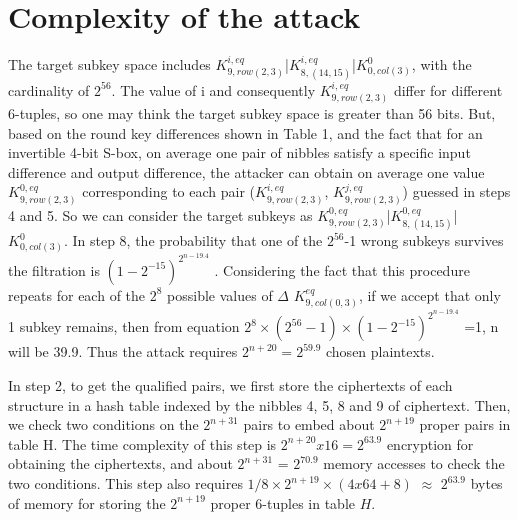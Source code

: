 \documentclass{transcrypto}
\begin{document}
	\section{Complexity of the attack}
	The target subkey space includes $K_{9,row(2,3)}^{i,eq}$|$K_{8,(14,15)}^{i,eq}$|$K_{0,col(3)}^{0}$, with the cardinality of $2^{56}$. The value of i and consequently $K_{9,row(2,3)}^{i,eq}$ differ for different 6-tuples, so one may think the target subkey space is greater than 56 bits. But, based on the round key differences shown in Table 1, and the fact that for an invertible 4-bit S-box, on average one pair of nibbles satisfy a specific input difference and output difference, the attacker can obtain on average one value $K_{9,row(2,3)}^{0,eq}$ corresponding to each pair ($K_{9,row(2,3)}^{i,eq}$, $K_{9,row(2,3)}^{j,eq}$) guessed in steps 4 and 5. So we can consider the target subkeys as $K_{9,row(2,3)}^{0,eq}$|$K_{8,(14,15)}^{0,eq}$|$K_{0,col(3)}^{0}$. In step 8, the probability that one of the $2^{56}$-1 wrong subkeys survives the filtration is $(1-2^{-15})^{2^{n-19.4}}$ . Considering the fact that this procedure repeats for each of the $2^8$ possible values of $\Delta$ $K_{9,col(0,3)}^{eq}$, if we accept that only 1 subkey remains, then from equation $2^8\times(2^{56}-1)\times(1-2^{-15})^{2^{n-19.4}}$ =1, n will be 39.9. Thus the attack requires $2^{n+20} = 2^{59.9}$ chosen plaintexts. 
	
	In step 2, to get the qualified pairs, we first store the ciphertexts of each structure in a hash table indexed by the nibbles 4, 5, 8 and 9 of ciphertext. Then, we check two conditions on the $2^{n+31}$ pairs to embed about $2^{n+19}$ proper pairs in table H. The time complexity of this step is $2^{n+20}x16=2^{63.9}$ encryption for obtaining the ciphertexts, and about $2^{n+31}$ = $2^{70.9}$ memory accesses to check the two conditions. This step also requires $1/8\times2^{n+19}\times(4x64+8)$ $\approx$ $2^{63.9}$ bytes of memory for storing the $2^{n+19}$ proper 6-tuples in table $H$.
	
\end{document}
